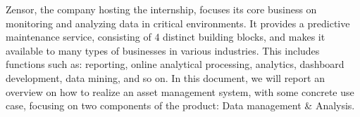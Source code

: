 Zensor, the company hosting the internship, focuses its core business on monitoring and analyzing data in critical environments. It provides a predictive maintenance service, consisting of 4 distinct building blocks, and makes it available to many types of businesses in various industries. This includes functions such as: reporting, online analytical processing, analytics, dashboard development, data mining, and so on.
In this document, we will report an overview on how to realize an asset management system, with some concrete use case, focusing on two components of the product: Data management \& Analysis.

\cleardoublepage